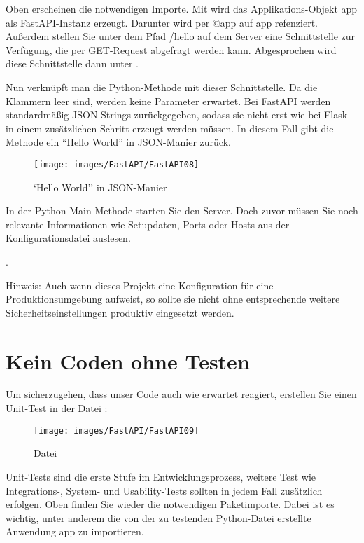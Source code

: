 Oben erscheinen die notwendigen Importe. Mit  wird das Applikations-Objekt app als FastAPI-Instanz erzeugt. Darunter wird per @app auf app refenziert. Außerdem stellen Sie unter dem Pfad /hello auf dem Server eine Schnittstelle zur Verfügung, die per GET-Request abgefragt werden kann. Abgesprochen wird diese Schnittstelle dann unter .

Nun verknüpft man die Python-Methode  mit dieser Schnittstelle. Da die Klammern leer sind, werden keine Parameter erwartet. Bei FastAPI werden standardmäßig JSON-Strings zurückgegeben, sodass sie nicht erst wie bei Flask in einem zusätzlichen Schritt erzeugt werden müssen. In diesem Fall gibt die Methode ein ``Hello World'' in JSON-Manier zurück.

\begin{figure}
    \texttt{[image: images/FastAPI/FastAPI08]}
    \caption{`Hello World'' in JSON-Manier} \label{FastAPI08}
\end{figure}


In der Python-Main-Methode starten Sie den Server. Doch zuvor müssen Sie noch relevante Informationen wie Setupdaten, Ports oder Hosts aus der Konfigurationsdatei  auslesen.

.

\medskip

Hinweis: Auch wenn dieses Projekt eine Konfiguration für eine Produktionsumgebung aufweist, so sollte sie nicht ohne entsprechende weitere Sicherheitseinstellungen produktiv eingesetzt werden.

\section{Kein Coden ohne Testen}

Um sicherzugehen, dass unser Code auch wie erwartet reagiert, erstellen Sie einen Unit-Test in der Datei :

\begin{figure}
    \texttt{[image: images/FastAPI/FastAPI09]}
    \caption{Datei } \label{FastAPI09}
\end{figure}

Unit-Tests sind die erste Stufe im Entwicklungsprozess, weitere Test wie Integrations-, System- und Usability-Tests sollten in jedem Fall zusätzlich erfolgen. Oben finden Sie wieder die notwendigen Paketimporte. Dabei ist es wichtig, unter anderem die von der zu testenden Python-Datei  erstellte Anwendung app zu importieren.

